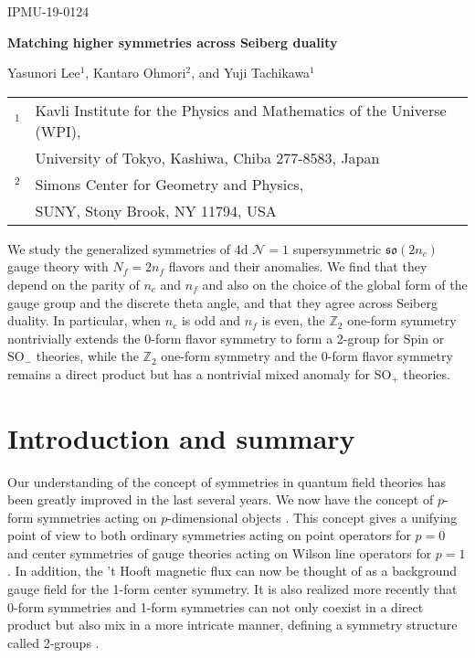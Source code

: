 \documentclass[12pt]{article}
\numberwithin{equation}{section}
\newcommand*{\bZ}{\mathbb{Z}}
\def\Nequals#1{$\mathcal{N}{=}#1$}
\def\SO{\mathrm{SO}}
\def\Spin{\mathrm{Spin}}
\begin{document}
\begin{titlepage}

\begin{flushright}
IPMU-19-0124
\end{flushright}

\vskip 3cm

\begin{center}

{\Large \bfseries Matching higher symmetries across Seiberg duality}


\vskip 1cm
Yasunori Lee$^1$, Kantaro Ohmori$^2$, and Yuji Tachikawa$^1$
\vskip 1cm

\begin{tabular}{ll}
$^1$ & Kavli Institute for the Physics and Mathematics of the Universe (WPI), \\
& University of Tokyo,  Kashiwa, Chiba 277-8583, Japan\\
$^2$ & Simons Center for Geometry and Physics, \\
& SUNY, Stony Brook, NY 11794, USA
\end{tabular}


\vskip 1cm

\end{center}


\noindent 
We study the generalized symmetries of 4d \Nequals1 supersymmetric $\mathfrak{so}(2n_c)$ gauge theory with $N_f=2n_f$ flavors and their anomalies.
We find that they depend on the parity of $n_c$ and $n_f$ 
and also on the choice of the global form of the gauge group and the discrete theta angle,
and that they agree across Seiberg duality.
In particular, when $n_c$ is odd and $n_f$ is even, 
the $\bZ_2$ one-form symmetry nontrivially extends the 0-form flavor symmetry to form a 2-group for $\Spin$ or $\SO_-$ theories,
while the $\bZ_2$ one-form symmetry and the 0-form flavor symmetry remains a direct product but has a nontrivial mixed anomaly for $\SO_+$ theories.


\end{titlepage}

\setcounter{tocdepth}{2}
\tableofcontents


\section{Introduction and summary}
Our understanding of the concept of symmetries in quantum field theories has been greatly improved in the last several years.
We now have the concept of $p$-form symmetries acting on $p$-dimensional objects \cite{Gaiotto:2014kfa}.
This concept  gives a unifying point of view to both
ordinary symmetries acting on point operators for $p=0$
and center symmetries of gauge theories acting on Wilson line operators for $p=1$.
In addition, the 't Hooft magnetic flux \cite{tHooft:1979rtg} can now be thought of as a background gauge field for the 1-form center symmetry.
It is also realized more recently that 0-form symmetries and 1-form symmetries can not only coexist in a direct product but also mix in a more intricate manner, defining a symmetry structure called 2-groups \cite{Cordova:2018cvg,Benini:2018reh}.
\end{document}
